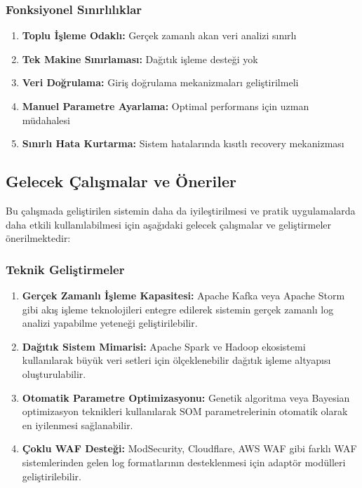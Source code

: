 \subsubsection{Fonksiyonel Sınırlılıklar}

\begin{enumerate}
    \item \textbf{Toplu İşleme Odaklı:} Gerçek zamanlı akan veri analizi sınırlı
    
    \item \textbf{Tek Makine Sınırlaması:} Dağıtık işleme desteği yok
    
    \item \textbf{Veri Doğrulama:} Giriş doğrulama mekanizmaları geliştirilmeli
    
    \item \textbf{Manuel Parametre Ayarlama:} Optimal performans için uzman müdahalesi
    
    \item \textbf{Sınırlı Hata Kurtarma:} Sistem hatalarında kısıtlı recovery mekanizması
\end{enumerate}

\subsection{Gelecek Çalışmalar ve Öneriler}

Bu çalışmada geliştirilen sistemin daha da iyileştirilmesi ve pratik uygulamalarda daha etkili kullanılabilmesi için aşağıdaki gelecek çalışmalar ve geliştirmeler önerilmektedir:

\subsubsection{Teknik Geliştirmeler}

\begin{enumerate}
    \item \textbf{Gerçek Zamanlı İşleme Kapasitesi:} Apache Kafka veya Apache Storm gibi akış işleme teknolojileri entegre edilerek sistemin gerçek zamanlı log analizi yapabilme yeteneği geliştirilebilir.
    
    \item \textbf{Dağıtık Sistem Mimarisi:} Apache Spark ve Hadoop ekosistemi kullanılarak büyük veri setleri için ölçeklenebilir dağıtık işleme altyapısı oluşturulabilir.
    
    \item \textbf{Otomatik Parametre Optimizasyonu:} Genetik algoritma veya Bayesian optimizasyon teknikleri kullanılarak SOM parametrelerinin otomatik olarak en iyilenmesi sağlanabilir.
    
    \item \textbf{Çoklu WAF Desteği:} ModSecurity, Cloudflare, AWS WAF gibi farklı WAF sistemlerinden gelen log formatlarının desteklenmesi için adaptör modülleri geliştirilebilir.
\end{enumerate}

